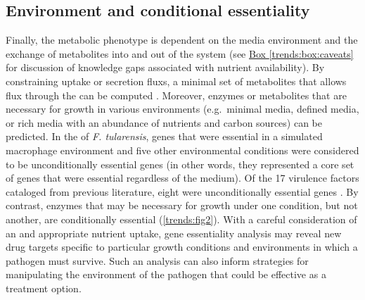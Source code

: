\subsection{Environment and conditional essentiality}
Finally, the metabolic phenotype is dependent on the media 
environment and the exchange of metabolites into and out of 
the system (see \hyperref[trends:box:caveats]{Box \ref{trends:box:caveats}} 
for discussion of knowledge gaps 
associated with nutrient availability). By constraining uptake 
or secretion \glspl{flux}, a minimal set of metabolites that allows 
\gls{flux} through the  
can be computed \cite{Chavali:2008gh}. Moreover, 
enzymes or metabolites that are necessary for growth in 
various environments (e.g.\ minimal media, defined media, 
or rich media with an abundance of nutrients and carbon sources) 
can be predicted. In the  of \textit{F. tularensis}, 
genes that were essential in a simulated macrophage environment 
and five other environmental conditions were considered to be 
unconditionally essential genes (in other words, they 
represented a core set of genes that were essential regardless 
of the medium). Of the 17 virulence factors cataloged from 
previous literature, eight were unconditionally essential 
genes \cite{Raghunathan:2010gl}. By contrast, enzymes that may be necessary for 
growth under one condition, but not another, are conditionally 
essential (\autoref{trends:fig2}). With a careful consideration of an 
and appropriate nutrient uptake, gene essentiality analysis may 
reveal new drug targets specific to particular growth conditions 
and environments in which a pathogen must survive. Such an 
analysis can also inform strategies for manipulating the 
environment of the pathogen that could be effective as a 
treatment option.


